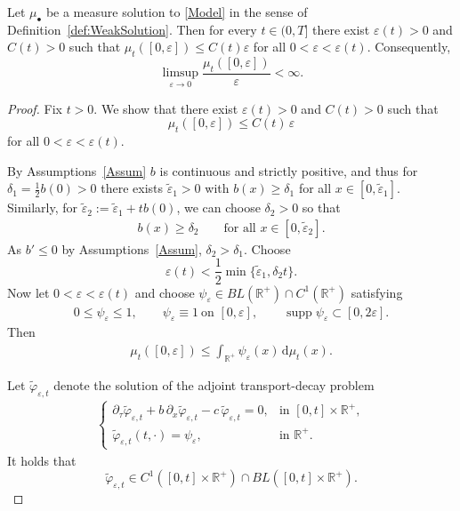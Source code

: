 \documentclass[10pt,a4paper]{amsart}
\newcommand{\R}{\mathbb{R}}
\newcommand{\ud}{\mathrm{d}}
\begin{document}
\begin{proposition}
\label{prop:abs_continuity}
Let $\mu_{\bullet}$ be a measure solution to \eqref{Model} in the sense of Definition~\ref{def:WeakSolution}.
Then for every
$t\in(0,T]$ there exist $\varepsilon(t)>0$ and $C(t)>0$ such that $\mu_t([0,\varepsilon])\le
C(t)\varepsilon $ 
for all
$0<\varepsilon<\varepsilon(t)$. Consequently,
\[
\limsup_{\varepsilon\to0}
\frac{\mu_t([0,\varepsilon])}{\varepsilon}
<\infty .
\]
\end{proposition}

\begin{proof}
Fix $t>0$. We show that there exist $\varepsilon(t)>0$ and $C(t)>0$ such that
\[
\mu_t([0,\varepsilon])\le C(t)\,\varepsilon
\]
for all $0<\varepsilon<\varepsilon(t)$.


\noindent By Assumptions~\ref{Assum} $b$ is continuous and strictly positive, and thus
for $\delta_1=\frac 1 2 b(0)>0$ there exists $\widetilde\varepsilon_1>0$  with  $b(x)\ge \delta_1$
 for all $x\in[0,\widetilde\varepsilon_1]$. 
Similarly, for $\tilde \varepsilon_2:=\tilde \varepsilon_1+tb(0)$, we can choose $\delta_2>0$ so that 
    \begin{align}
    \label{delta_2_bound}
        b(x)\geq \delta_2\qquad\text{for all }x\in[0,\widetilde\varepsilon_2].
    \end{align}
As $b'\leq 0$ by Assumptions~\ref{Assum}, $\delta_2>\delta_1$. Choose 
\[
\varepsilon(t)
<
\frac12\min\{\widetilde\varepsilon_1,\delta_2 t\}.
\]
\noindent Now let $0<\varepsilon<\varepsilon(t)$ and choose $\psi_\varepsilon\in BL(\R^+)\cap C^1(\R^+)$ satisfying
\begin{align*}
0\le \psi_\varepsilon\le 1,\qquad
\psi_\varepsilon\equiv 1 \ \text{on }[0,\varepsilon],
\qquad
\operatorname{supp}\psi_\varepsilon\subset[0,2\varepsilon].
\end{align*}
Then
\begin{align}
\label{estimate_mu_t}
\mu_t([0,\varepsilon])
\le
\int_{\R^+}\psi_\varepsilon(x)\,\ud\mu_t(x).
\end{align}


\noindent Let $\tilde \varphi_{\varepsilon,t}$ denote the solution of the adjoint
transport-decay problem
\begin{align}
\label{adjusted_dual_problem}
\left\{
\begin{array}{lll}
\partial_{\tau}\tilde \varphi_{\varepsilon,t}
+b\,\partial_x\tilde \varphi_{\varepsilon,t}
-c\,\tilde \varphi_{\varepsilon,t}
=0,
& \text{in } [0,t]\times\R^+,\\[1mm]
\tilde \varphi_{\varepsilon,t}(t,\cdot)
=\psi_\varepsilon,
& \text{in } \R^+.
\end{array}
\right.
\end{align}
It holds that
\[
\tilde \varphi_{\varepsilon,t}\in
C^1([0,t]\times\R^+)\cap BL([0,t]\times\R^+).
\]



\end{proof}
\end{document}
